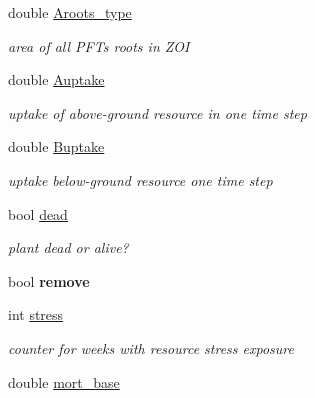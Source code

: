 \begin{DoxyCompactItemize}
double \mbox{\hyperlink{class_c_plant_a732da37520b82a5000e50c0b0699a136}{Aroots\+\_\+type}}
\begin{DoxyCompactList}\small\item\em area of all P\+FT\textquotesingle{}s roots in Z\+OI \end{DoxyCompactList}\item 
\mbox{\label{class_c_plant_a9a4beaf344a1aaf6bdd387f759102c45}} 
double \mbox{\hyperlink{class_c_plant_a9a4beaf344a1aaf6bdd387f759102c45}{Auptake}}
\begin{DoxyCompactList}\small\item\em uptake of above-\/ground resource in one time step \end{DoxyCompactList}\item 
\mbox{\label{class_c_plant_a90e173d63c152397bae17e82500b35ca}} 
double \mbox{\hyperlink{class_c_plant_a90e173d63c152397bae17e82500b35ca}{Buptake}}
\begin{DoxyCompactList}\small\item\em uptake below-\/ground resource one time step \end{DoxyCompactList}\item 
\mbox{\label{class_c_plant_a14abe37dd7e7052c872c683569ff7739}} 
bool \mbox{\hyperlink{class_c_plant_a14abe37dd7e7052c872c683569ff7739}{dead}}
\begin{DoxyCompactList}\small\item\em plant dead or alive? \end{DoxyCompactList}\item 
\mbox{\label{class_c_plant_a8476399d04c4691af6a8e6b506c43bb5}} 
bool {\bfseries remove}
\item 
\mbox{\label{class_c_plant_a07717aaec80286b5f1ef2d081557ce5a}} 
int \mbox{\hyperlink{class_c_plant_a07717aaec80286b5f1ef2d081557ce5a}{stress}}
\begin{DoxyCompactList}\small\item\em counter for weeks with resource stress exposure \end{DoxyCompactList}\item 
\mbox{\label{class_c_plant_a2b183ca2f8c69cb3dfebf7c15e0cac62}} 
double \mbox{\hyperlink{class_c_plant_a2b183ca2f8c69cb3dfebf7c15e0cac62}{mort\+\_\+base}}

\end{DoxyCompactItemize}
